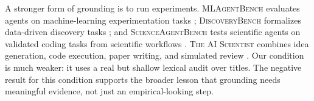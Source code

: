  A stronger form of grounding is to run experiments. \textsc{MLAgentBench} evaluates agents on machine-learning experimentation tasks \citep{huang2023mlagentbench}; \textsc{DiscoveryBench} formalizes data-driven discovery tasks \citep{majumder2024discoverybench}; and \textsc{ScienceAgentBench} tests scientific agents on validated coding tasks from scientific workflows \citep{chen2024scienceagentbench}. \textsc{The AI Scientist} combines idea generation, code execution, paper writing, and simulated review \citep{lu2024aiscientist}. Our \smallexperiment condition is much weaker: it uses a real but shallow lexical audit over titles. The negative result for this condition supports the broader lesson that grounding needs meaningful evidence, not just an empirical-looking step.
